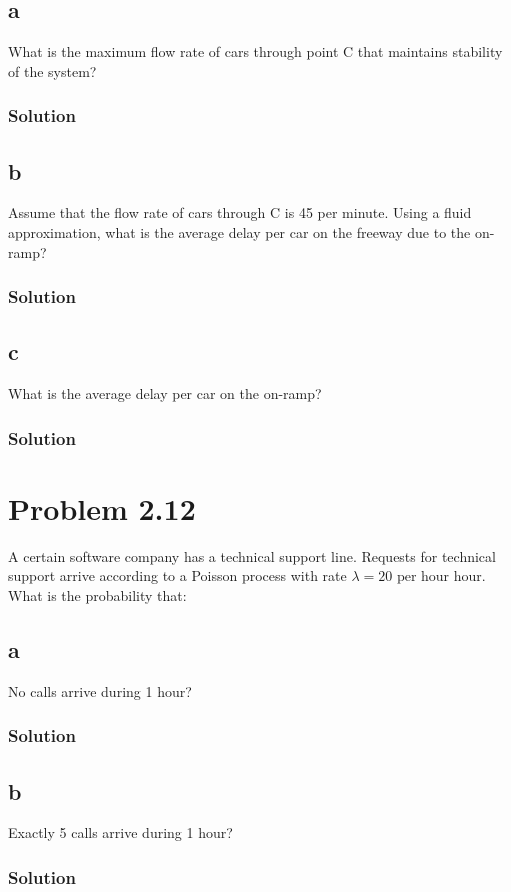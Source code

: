 \documentclass[letterpaper]{amsart}
\begin{document}
\subsection*{a}
What is the maximum flow rate of cars through point C that maintains
stability of the system?
\subsubsection*{Solution}
\subsection*{b}
Assume that the flow rate of cars through C is 45 per minute. Using a
fluid approximation, what is the average delay per car on the freeway
due to the on-ramp?
\subsubsection*{Solution}
\subsection*{c}
What is the average delay per car on the on-ramp?
\subsubsection*{Solution}

\section{Problem 2.12} %
A certain software company has a technical support line. Requests for
technical support arrive according to a Poisson process with rate
$\lambda=20\text{ per hour}$ hour. What is the probability that:
\subsection*{a}
No calls arrive during 1 hour?
\subsubsection*{Solution}
\subsection*{b}
Exactly 5 calls arrive during 1 hour?
\subsubsection*{Solution}
\end{document}
